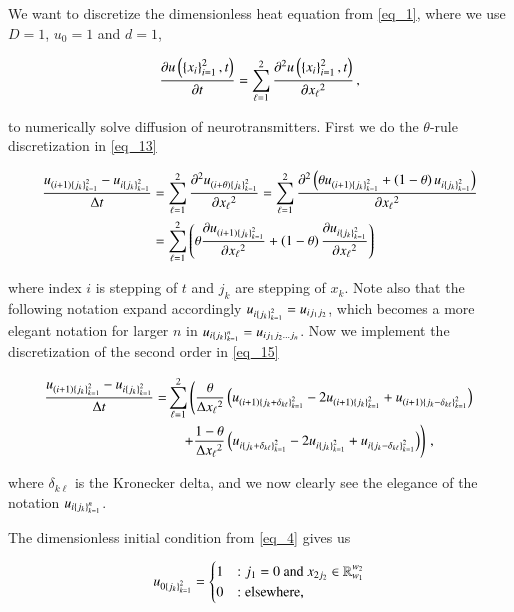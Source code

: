 \documentclass[11pt,english,a4paper]{article}
\begin{document}
\begin{flushleft}
We want to discretize the dimensionless heat equation from \eqref{eq_1}, where we use $D=1$, $u_0=1$ and $d=1$, 

\begin{align*}
\frac{\partial u\left({\left\lbrace{x_i}\right\rbrace_{i=1}^2,t}\right)}{\partial t} = \sum_{\ell=1}^2\frac{\partial^2 u\left({\left\lbrace{x_i}\right\rbrace_{i=1}^2,t}\right)}{\partial {x_\ell}^2}\,,
\end{align*}

to numerically solve diffusion of neurotransmitters. First we do the $\theta$-rule discretization in \eqref{eq_13} 

\begin{align*}
\frac{u_{(i+1)\left\lbrace{j_k}\right\rbrace_{k=1}^2}-u_{i\left\lbrace{j_k}\right\rbrace_{k=1}^2}}{\Delta t} 
&= \sum_{\ell = 1}^2\frac{\partial^2 u_{(i+\theta)\left\lbrace{j_k}\right\rbrace_{k=1}^2}}{\partial {x_\ell}^2} 
= \sum_{\ell=1}^2\frac{\partial^2 \left({\theta u_{(i+1)\left\lbrace{j_k}\right\rbrace_{k=1}^2}+\left({1-\theta}\right)u_{i\left\lbrace{j_k}\right\rbrace_{k=1}^2}}\right)}{\partial {x_\ell}^2} 
\\
&= \sum_{\ell=1}^2\left({\theta \frac{\partial u_{(i+1)\left\lbrace{j_k}\right\rbrace_{k=1}^2}}{\partial {x_\ell}^2} + \left({1-\theta}\right)\frac{\partial u_{i\left\lbrace{j_k}\right\rbrace_{k=1}^2}}{\partial {x_\ell}^2}}\right)
\end{align*}

where index $i$ is stepping of $t$ and $j_k$ are stepping of $x_k$. Note also that the following notation expand accordingly $u_{i\left\lbrace{j_k}\right\rbrace_{k=1}^2} = u_{ij_1 j_2}$, which becomes a more elegant notation for larger $n$ in $u_{i\left\lbrace{j_k}\right\rbrace_{k=1}^n} = u_{ij_1j_2\ldots j_n}$. Now we implement the discretization of the second order in \eqref{eq_15}

\begin{align}
\frac{u_{(i+1)\left\lbrace{j_k}\right\rbrace_{k=1}^2}-u_{i\left\lbrace{j_k}\right\rbrace_{k=1}^2}}{\Delta t} =& \sum_{\ell=1}^2 \left(\frac{\theta}{\Delta {x_\ell}^2}\left({u_{(i+1)\left\lbrace{j_k+\delta_{k\ell}}\right\rbrace_{k=1}^2} - 2 u_{(i+1)\left\lbrace{j_k}\right\rbrace_{k=1}^2} + u_{(i+1)\left\lbrace{j_k-\delta_{k\ell}}\right\rbrace_{k=1}^2}}\right) \right.
\nonumber\\
&\quad \left. + \frac{1-\theta}{\Delta {x_\ell}^2}\left({u_{i\left\lbrace{j_k+\delta_{k\ell}}\right\rbrace_{k=1}^2} - 2u_{i\left\lbrace{j_k}\right\rbrace_{k=1}^2} +u_{i\left\lbrace{j_k-\delta_{k\ell}}\right\rbrace_{k=1}^2}}\right)\right) \,,
\label{eq_16}
\end{align}

where $\delta_{k\ell}$ is the Kronecker delta, and we now clearly see the elegance of the notation $u_{i\left\lbrace{j_k}\right\rbrace_{k=1}^n}$. \linebreak

The dimensionless initial condition from \eqref{eq_4} gives us

\begin{align*}
u_{0\left\lbrace{j_k}\right\rbrace_{k=1}^2} = \begin{cases} 1 & : j_1 = 0 \text{ and } x_{2 j_2} \in \mathbb{R}_{w_1}^{w_2} \\ 0 & :\text{elsewhere,} \end{cases} 
\end{align*}


\end{flushleft}
\end{document}

